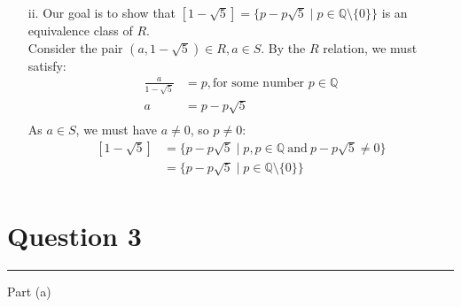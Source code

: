 \documentclass{article}
\begin{document}
\begin{enumerate}
\begin{enumerate}
              \item [ii. ] Our goal is to show that $[1-\sqrt{5}]=\{p-p\sqrt{5} \mid p \in \mathbb{Q} \setminus\{0\}\}$ is an equivalence class of $R$.\\
                    Consider the pair $(a,1-\sqrt{5}) \in R, a \in S$. By the $R$ relation, we must satisfy:
                    \[\begin{aligned}
                            \frac{a}{1-\sqrt{5}} & = p, \text{for some number } p \in \mathbb{Q} \\
                            a                    & = p - p\sqrt{5}                               \\
                        \end{aligned}\]
                    As $a \in S$, we must have $a \neq 0$, so $p \neq 0$:\\
                    \[\begin{aligned}
                            [1-\sqrt{5}] & =\{p-p\sqrt{5} \mid p,p\in\mathbb{Q}\mathrm{~and~}p-p\sqrt{5}\neq0\} \\
                                         & = \{p-p\sqrt{5} \mid p \in \mathbb{Q} \setminus\{0\}\}               \\
                        \end{aligned}\]
          \end{enumerate}

\end{enumerate}

\section*{Question 3}
\hrule
\vspace{0.5cm}

Part (a)
\end{document}
